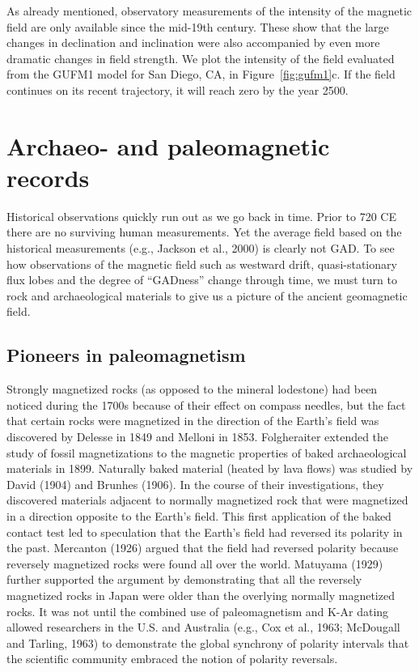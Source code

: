 As already mentioned, observatory measurements of the intensity of the magnetic field are only available since the mid-19th century.  These show that the  large changes in declination and inclination were also accompanied by even more dramatic changes in field strength.  We plot the intensity of the field evaluated from the GUFM1 model  for San Diego, CA, in Figure~\ref{fig:gufm1}c.  If the field continues on its recent trajectory, it will reach zero by the year 2500.  

\section{Archaeo- and paleomagnetic records}
\label{sect:psv}

Historical observations quickly run out as we go back in time.  Prior to 720 CE there are no surviving human measurements.  Yet the average field based on the historical measurements
 (e.g., Jackson et al., 2000) is clearly not  GAD.   To see how observations of the magnetic field such as westward drift, quasi-stationary flux lobes and the degree of  ``GADness'' change through time, we must turn to rock and archaeological materials to give us a picture of the ancient geomagnetic field.  


\subsection{Pioneers in paleomagnetism}

Strongly magnetized rocks (as opposed to the mineral lodestone) had been noticed during the 1700s because of their effect on compass needles, but the fact that certain rocks were magnetized in the direction of the Earth's field was discovered by Delesse in 1849 and Melloni in 1853.   
  Folgheraiter extended the study of fossil magnetizations to the magnetic properties of baked archaeological materials in 1899.    \nocite{folgheraiter1899}
Naturally baked material (heated by lava flows) was studied by 
David (1904) \nocite{david04} and 
Brunhes (1906). \nocite{brunhes06}  In the course of their investigations, they discovered materials adjacent to normally magnetized rock  that were magnetized in a direction opposite to the Earth's field.  This first application of the baked contact test led to speculation that the Earth's field had reversed its polarity in the past.   
 \nocite{mercanton26}
 Mercanton (1926)  argued that the field had reversed polarity because reversely magnetized rocks were found all over the world.   
  \nocite{matuyama29}
 Matuyama (1929)   further supported the argument by demonstrating that all the reversely magnetized rocks in Japan were older than the overlying normally magnetized rocks.   It was not until the combined use of paleomagnetism and K-Ar dating allowed  researchers in the U.S. and Australia (e.g., 
  \nocite{cox63} \nocite{mcdougall63}
 Cox et al., 1963; 
 McDougall and Tarling, 1963) to demonstrate the global synchrony of polarity intervals that the scientific community embraced the notion of polarity reversals.  


